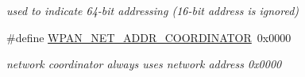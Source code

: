 \begin{DoxyCompactItemize}
\begin{DoxyCompactList}\small\item\em used to indicate 64-\/bit addressing (16-\/bit address is ignored) \end{DoxyCompactList}\item 
\hypertarget{group__wpan__types_ga5158cbab6c4139bd77d1d3f80d9071b2}{\#define \hyperlink{group__wpan__types_ga5158cbab6c4139bd77d1d3f80d9071b2}{W\-P\-A\-N\-\_\-\-N\-E\-T\-\_\-\-A\-D\-D\-R\-\_\-\-C\-O\-O\-R\-D\-I\-N\-A\-T\-O\-R}~0x0000}\label{group__wpan__types_ga5158cbab6c4139bd77d1d3f80d9071b2}

\begin{DoxyCompactList}\small\item\em network coordinator always uses network address 0x0000 \end{DoxyCompactList}\end{DoxyCompactItemize}
